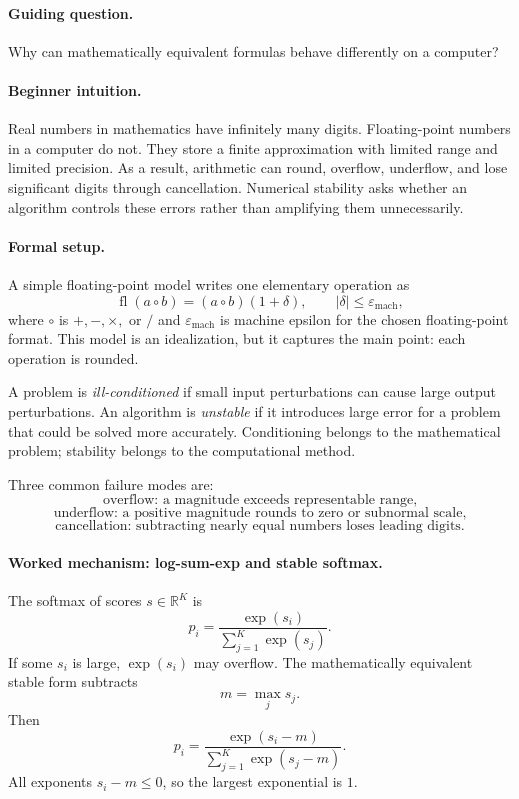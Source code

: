 \paragraph{Guiding question.}
Why can mathematically equivalent formulas behave differently on a computer?

\paragraph{Beginner intuition.}
Real numbers in mathematics have infinitely many digits. Floating-point numbers in a computer do not. They store a finite approximation with limited range and limited precision. As a result, arithmetic can round, overflow, underflow, and lose significant digits through cancellation. Numerical stability asks whether an algorithm controls these errors rather than amplifying them unnecessarily.

\paragraph{Formal setup.}
A simple floating-point model writes one elementary operation as
\[
\operatorname{fl}(a\circ b)=(a\circ b)(1+\delta),
\qquad |\delta|\leq \varepsilon_{\mathrm{mach}},
\]
where \(\circ\) is \(+,-,\times,\) or \(/\) and \(\varepsilon_{\mathrm{mach}}\) is machine epsilon for the chosen floating-point format. This model is an idealization, but it captures the main point: each operation is rounded.

A problem is \emph{ill-conditioned} if small input perturbations can cause large output perturbations. An algorithm is \emph{unstable} if it introduces large error for a problem that could be solved more accurately. Conditioning belongs to the mathematical problem; stability belongs to the computational method.

Three common failure modes are:
\[
\text{overflow: a magnitude exceeds representable range,}
\]
\[
\text{underflow: a positive magnitude rounds to zero or subnormal scale,}
\]
\[
\text{cancellation: subtracting nearly equal numbers loses leading digits.}
\]

\paragraph{Worked mechanism: log-sum-exp and stable softmax.}
The softmax of scores \(s\in\mathbb{R}^K\) is
\[
p_i=\frac{\exp(s_i)}{\sum_{j=1}^K\exp(s_j)}.
\]
If some \(s_i\) is large, \(\exp(s_i)\) may overflow. The mathematically equivalent stable form subtracts
\[
m=\max_j s_j.
\]
Then
\[
p_i=\frac{\exp(s_i-m)}{\sum_{j=1}^K\exp(s_j-m)}.
\]
All exponents \(s_i-m\leq 0\), so the largest exponential is \(1\).

